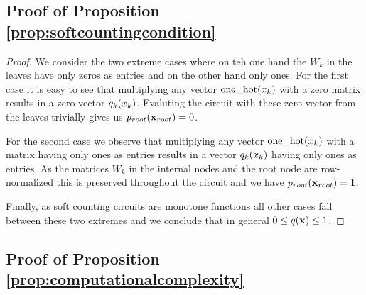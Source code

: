 \subsection{Proof of Proposition \ref{prop:softcountingcondition}}
\label{sec:proof:prop:softcountingcondition}

\propsoftcountingcondition*

\begin{proof}
	We consider the two extreme cases where on teh one hand the $W_k$ in the leaves have only zeros as entries and on the other hand only ones. For the first case it is easy to see that multiplying any vector $\text{one\_hot}(x_k)$ with a zero matrix results in a zero vector $q_k(x_k)$. Evaluting the circuit with these zero vector from the leaves trivially gives us $p_{root}(\mathbf{x}_{root})=0$.

	For the second case we observe that multiplying any vector $\text{one\_hot}(x_k)$ with a matrix having only ones as entries results in a vector $q_k(x_k)$ having only ones as entries. As the matrices $W_k$ in the internal nodes and the root node are row-normalized this is preserved throughout the circuit and we have $p_{root}(\mathbf{x}_{root})=1$.

	Finally, as soft counting circuits are monotone functions all other cases fall between these two extremes and we conclude that in general $0\leq q(\mathbf{x})\leq 1$.
\end{proof}




\subsection{Proof of Proposition \ref{prop:computationalcomplexity}}
\label{sec:proof:prop:computationalcomplexity}

\propcomputationalcomplexity*

